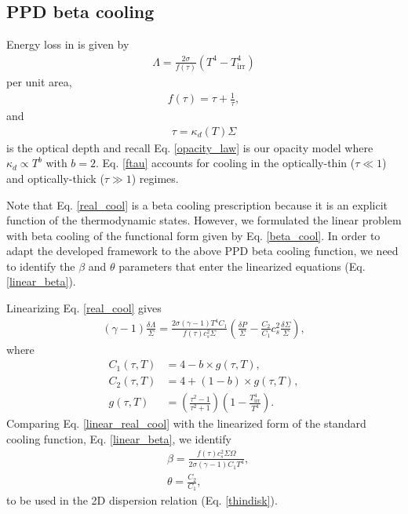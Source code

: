 \subsection{PPD beta cooling}
Energy loss in  is given by 
\begin{align}\label{real_cool}
  \Lambda = \frac{2\sigma}{f(\tau)}\left(T^4 - T_\mathrm{irr}^4\right)
\end{align}
per unit area, 
\begin{align}
  f(\tau) = \tau + \frac{1}{\tau}, \label{ftau} 
\end{align}
and
\begin{align}
  \tau = \kappa_d(T)\Sigma
\end{align}
is the optical depth and recall Eq. \ref{opacity_law} 
is our opacity model where $\kappa_d\propto T^b$ with $b=2$. 
Eq. \ref{ftau} accounts for cooling in the optically-thin ($\tau\ll
1$) and optically-thick ($\tau\gg1$) regimes. 

Note that Eq. \ref{real_cool} is a beta cooling prescription because
it is an explicit function of the thermodynamic states. However, we
formulated the linear problem with beta cooling of the functional form
given by Eq. \ref{beta_cool}. In order to adapt the developed
framework to the above PPD beta cooling function, we
need to identify the $\beta$ and $\theta$ parameters that enter the 
linearized equations (Eq. \ref{linear_beta}). 
 

Linearizing Eq. \ref{real_cool} gives   
\begin{align}\label{linear_real_cool}
  (\gamma-1)\frac{\delta\Lambda}{\Sigma} = \frac{2\sigma(\gamma-1)
    T^4C_1}{f(\tau)c_{s}^2\Sigma}\left(\frac{\delta P}{\Sigma} -
  \frac{C_2}{C_1}c_{s}^2\frac{\delta\Sigma}{\Sigma}\right), 
\end{align}
where
\begin{align}
C_1(\tau, T) &= 4 - b\times g(\tau, T),\\ 
C_2(\tau, T) &= 4 + (1-b)\times g(\tau, T),\\ 
  g(\tau, T) &= \left( \frac{\tau^2-1}{\tau^2+1}\right)\left(1 -
  \frac{T_\mathrm{irr}^4}{T^4}\right). \label{g_def}
\end{align}
Comparing Eq. \ref{linear_real_cool} with the linearized form of the
standard cooling function, Eq. \ref{linear_beta}, we identify
\begin{align}
  &\beta = \frac{f(\tau)c_s^2\Sigma\Omega}{2\sigma(\gamma-1)C_1T^4},\label{real_beta}\\
  &\theta = \frac{C_2}{C_1},\label{real_theta} 
\end{align}
to be used in the 2D dispersion relation (Eq. \ref{thindisk}). 


